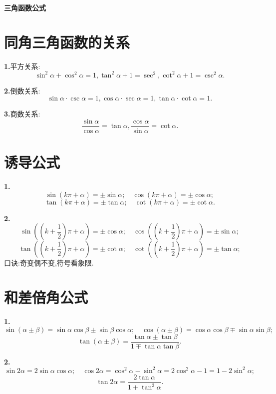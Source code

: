 \documentclass{article}
\title{\vspace*{-2.5cm}\textbf{\songti{\LARGE 三角函数公式}} \vspace*{-2cm}}
\date{}
\author{}
\begin{document}
\vspace*{\fill}
\begin{center}
	{\textbf{{\huge\hspace*{\fill+2cm}三\hspace{\fill}角\hspace{\fill}函\hspace{\fill}数\hspace{\fill}公\hspace{\fill}式\hspace*{\fill+2cm}}}}
\end{center}
\pagestyle{empty}
\vspace*{\fill+3cm}
\newpage
\quad
\newpage
\maketitle
\pagestyle{plain}
\setcounter{page}{1}
\section{{\large 同角三角函数的关系}}
\textbf{1.}平方关系:
\[\sin^2\alpha+\cos^2\alpha=1,\tan^2\alpha+1=\sec^2,\cot^2\alpha+1=\csc^2\alpha.\]
\par\textbf{2.}倒数关系:
\[\sin\alpha\cdot\csc\alpha=1,\cos\alpha\cdot\sec\alpha=1,\tan\alpha\cdot\cot\alpha=1.\]
\par\textbf{3.}商数关系:
\[\frac{\sin\alpha}{\cos\alpha}=\tan\alpha,\frac{\cos\alpha}{\sin\alpha}=\cot\alpha.\]

\section{{\large 诱导公式}}
\textbf{1.}
\[\sin(k\pi+\alpha)=\pm\sin\alpha;\quad
\cos(k\pi+\alpha)=\pm\cos\alpha;\]
\[\tan(k\pi+\alpha)=\pm\tan\alpha;\quad
\cot(k\pi+\alpha)=\pm\cot\alpha.\]
\par\textbf{2.}
\[\sin\left(\left(k+\frac12\right)\pi+\alpha\right)=\pm\cos\alpha;\quad\cos\left(\left(k+\frac12\right)\pi+\alpha\right)=\pm\sin\alpha;\]
\[\tan\left(\left(k+\frac12\right)\pi+\alpha\right)=\pm\cot\alpha;\quad\cot\left(\left(k+\frac12\right)\pi+\alpha\right)=\pm\tan\alpha;\]
口诀:{\kaishu 奇变偶不变,符号看象限.}

\section{{\large 和差倍角公式}}
\textbf{1.}
\[\sin(\alpha\pm\beta)=\sin\alpha\cos\beta\pm\sin\beta\cos\alpha;\quad\cos(\alpha\pm\beta)=\cos\alpha\cos\beta\mp\sin\alpha\sin\beta;\]
\[\tan(\alpha\pm\beta)=\frac{\tan\alpha\pm\tan\beta}{1\mp\tan\alpha\tan\beta}.\]
\par\textbf{2.}
\[\sin2\alpha=2\sin\alpha\cos\alpha;\quad \cos2\alpha=\cos^2\alpha-\sin^2\alpha=2\cos^2\alpha-1=1-2\sin^2\alpha;\]
\[\tan2\alpha=\frac{2\tan\alpha}{1+\tan^2\alpha}.\]
\end{document}
